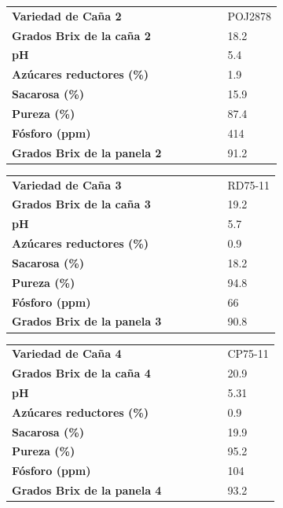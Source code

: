 \documentclass{article}%
\begin{document}
\linebreak%
\newline%
%
\linebreak%
\begin{tabular}{lcccccl}%
\textbf{Variedad de Caña 2}& & & & & &POJ2878\\%
\textbf{Grados Brix de la caña 2}& & & & & &18.2\\%
\textbf{pH}& & & & & &5.4\\%
\textbf{Azúcares reductores (\%)}& & & & & &1.9\\%
\textbf{Sacarosa (\%)}& & & & & &15.9\\%
\textbf{Pureza (\%)}& & & & & &87.4\\%
\textbf{Fósforo (ppm)}& & & & & &414\\%
\textbf{Grados Brix de la panela 2}& & & & & &91.2\\%
\end{tabular}%
\linebreak%
\newline%
%
\linebreak%
\begin{tabular}{lcccccl}%
\textbf{Variedad de Caña 3}& & & & & &RD75{-}11\\%
\textbf{Grados Brix de la caña 3}& & & & & &19.2\\%
\textbf{pH}& & & & & &5.7\\%
\textbf{Azúcares reductores (\%)}& & & & & &0.9\\%
\textbf{Sacarosa (\%)}& & & & & &18.2\\%
\textbf{Pureza (\%)}& & & & & &94.8\\%
\textbf{Fósforo (ppm)}& & & & & &66\\%
\textbf{Grados Brix de la panela 3}& & & & & &90.8\\%
\end{tabular}%
\linebreak%
\newline%
%
\linebreak%
\begin{tabular}{lcccccl}%
\textbf{Variedad de Caña 4}& & & & & &CP75{-}11\\%
\textbf{Grados Brix de la caña 4}& & & & & &20.9\\%
\textbf{pH}& & & & & &5.31\\%
\textbf{Azúcares reductores (\%)}& & & & & &0.9\\%
\textbf{Sacarosa (\%)}& & & & & &19.9\\%
\textbf{Pureza (\%)}& & & & & &95.2\\%
\textbf{Fósforo (ppm)}& & & & & &104\\%
\textbf{Grados Brix de la panela 4}& & & & & &93.2\\%
\end{tabular}%
\end{document}
